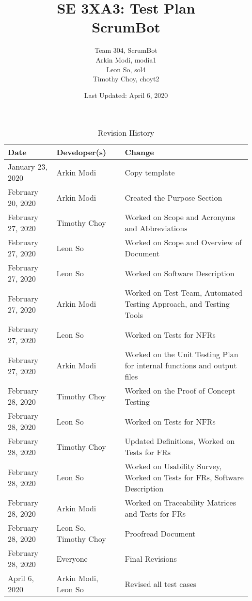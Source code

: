 \documentclass[12pt, titlepage]{article}
\title{SE 3XA3: Test Plan\\ScrumBot}
\author{
	Team 304, ScrumBot
		\\ Arkin Modi, modia1
        \\ Leon So, sol4
        \\ Timothy Choy, choyt2
}
\date{Last Updated: April 6, 2020}
\begin{document}
\newpage
\maketitle

\tableofcontents
\listoftables
\listoffigures

\newpage

\begin{table}[!hbp]
    \caption{Revision History} \label{TblRevisionHistory}
    \begin{tabularx}{\textwidth}{llX}
        \toprule
            \textbf{Date} & \textbf{Developer(s)} & \textbf{Change}\\
        \midrule
            January 23, 2020 & Arkin Modi & Copy template\\
            February 20, 2020 & Arkin Modi & Created the Purpose Section\\
            February 27, 2020 & Timothy Choy & Worked on Scope and Acronyms and Abbreviations\\
            February 27, 2020 & Leon So & Worked on Scope and Overview of Document\\
            February 27, 2020 & Leon So & Worked on Software Description\\
            February 27, 2020 & Arkin Modi & Worked on Test Team, Automated Testing Approach, and Testing Tools\\
            February 27, 2020 & Leon So & Worked on Tests for NFRs\\
            February 27, 2020 & Arkin Modi & Worked on the Unit Testing Plan for internal functions and output files\\
            February 28, 2020 & Timothy Choy & Worked on the Proof of Concept Testing\\
            February 28, 2020 & Leon So & Worked on Tests for NFRs\\
            February 28, 2020 & Timothy Choy & Updated Definitions, Worked on Tests for FRs\\
            February 28, 2020 & Leon So & Worked on Usability Survey, Worked on Tests for FRs, Software Description\\
            February 28, 2020 & Arkin Modi & Worked on Traceability Matrices and Tests for FRs\\
            February 28, 2020 & Leon So, Timothy Choy & Proofread Document\\
            February 28, 2020 & Everyone & Final Revisions\\
            April 6, 2020 & Arkin Modi, Leon So & Revised all test cases\\
        \bottomrule
    \end{tabularx}
\end{table}
\end{document}
